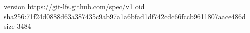 version https://git-lfs.github.com/spec/v1
oid sha256:71f24d0888d63a387435c9ab97a1a6bfad1df742cdc66fccb9611807aace486d
size 3484
